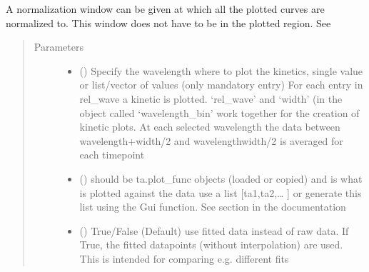 \documentclass[letterpaper,10pt,english]{sphinxmanual}
\begin{document}
\begin{fulllineitems}
\begin{fulllineitems}
A normalization window can be given at which all the plotted curves are normalized to.
This window does not have to be in the plotted region. See {\hyperref[\detokenize{Comparing:normalization-and-scaling}]{}}
\begin{quote}\begin{description}
\item[{Parameters}] \leavevmode\begin{itemize}
\item {} 
 (\sphinxstyleliteralemphasis{\sphinxupquote{ (}}\sphinxstyleliteralemphasis{\sphinxupquote{)}}) \textendash{} Specify the wavelength where to plot the kinetics, single value or
list/vector of values (only mandatory entry) For each entry in
rel\_wave a kinetic is plotted. ‘rel\_wave’ and ‘width’
(in the object called ‘wavelength\_bin’ work together for the creation
of kinetic plots. At each selected wavelength the data between
wavelength+width/2 and wavelength\sphinxhyphen{}width/2 is averaged
for each timepoint

\item {} 
 (\sphinxstyleliteralemphasis{\sphinxupquote{, }}) \textendash{} should be ta.plot\_func objects (loaded or copied) and is what
is plotted against the data use a list {[}ta1,ta2,… {]} or generate this
list using the Gui function. See section {\hyperref[\detokenize{Opening:opening-multiple-files}]{}} in
the documentation

\item {} 
 (\sphinxstyleliteralemphasis{\sphinxupquote{, }}) \textendash{} True/False (Default) \sphinxhyphen{} use fitted data instead of raw data.
If True, the fitted datapoints (without interpolation) are used.
This is intended for comparing e.g. different fits


\end{itemize}
\end{description}
\end{quote}
\end{fulllineitems}
\end{fulllineitems}
\end{document}
